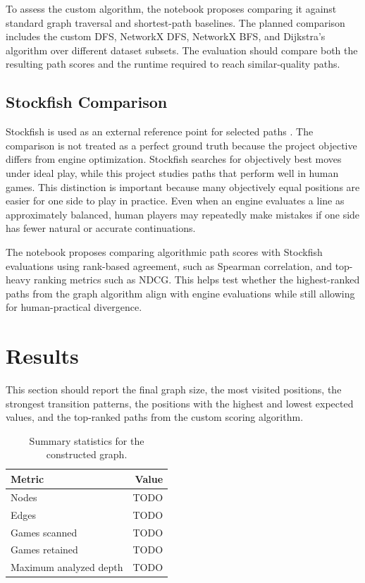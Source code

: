 \documentclass[11pt,a4paper]{article}
\begin{document}
To assess the custom algorithm, the notebook proposes comparing it against standard graph traversal and shortest-path baselines.
The planned comparison includes the custom DFS, NetworkX DFS, NetworkX BFS, and Dijkstra's algorithm over different dataset subsets.
The evaluation should compare both the resulting path scores and the runtime required to reach similar-quality paths.

\subsection{Stockfish Comparison}

Stockfish is used as an external reference point for selected paths \citep{stockfish}.
The comparison is not treated as a perfect ground truth because the project objective differs from engine optimization.
Stockfish searches for objectively best moves under ideal play, while this project studies paths that perform well in human games.
This distinction is important because many objectively equal positions are easier for one side to play in practice.
Even when an engine evaluates a line as approximately balanced, human players may repeatedly make mistakes if one side has fewer natural or accurate continuations.

The notebook proposes comparing algorithmic path scores with Stockfish evaluations using rank-based agreement, such as Spearman correlation, and top-heavy ranking metrics such as NDCG.
This helps test whether the highest-ranked paths from the graph algorithm align with engine evaluations while still allowing for human-practical divergence.

\section{Results}

This section should report the final graph size, the most visited positions, the strongest transition patterns, the positions with the highest and lowest expected values, and the top-ranked paths from the custom scoring algorithm.

\begin{table}[h]
  \centering
  \caption{Summary statistics for the constructed graph.}
  \label{tab:graph-summary}
  \begin{tabular}{lr}
    \toprule
    Metric & Value \\
    \midrule
    Nodes & TODO \\
    Edges & TODO \\
    Games scanned & TODO \\
    Games retained & TODO \\
    Maximum analyzed depth & TODO \\
    \bottomrule
  \end{tabular}
\end{table}
\end{document}
